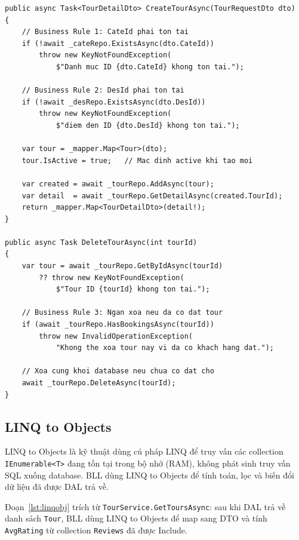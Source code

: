 \begin{lstlisting}[style=csharp,
  caption={Business Rules trong TourService --- Create và Delete},
  label={lst:bizrule}]
public async Task<TourDetailDto> CreateTourAsync(TourRequestDto dto)
{
    // Business Rule 1: CateId phai ton tai
    if (!await _cateRepo.ExistsAsync(dto.CateId))
        throw new KeyNotFoundException(
            $"Danh muc ID {dto.CateId} khong ton tai.");

    // Business Rule 2: DesId phai ton tai
    if (!await _desRepo.ExistsAsync(dto.DesId))
        throw new KeyNotFoundException(
            $"diem den ID {dto.DesId} khong ton tai.");

    var tour = _mapper.Map<Tour>(dto);
    tour.IsActive = true;   // Mac dinh active khi tao moi

    var created = await _tourRepo.AddAsync(tour);
    var detail  = await _tourRepo.GetDetailAsync(created.TourId);
    return _mapper.Map<TourDetailDto>(detail!);
}

public async Task DeleteTourAsync(int tourId)
{
    var tour = await _tourRepo.GetByIdAsync(tourId)
        ?? throw new KeyNotFoundException(
            $"Tour ID {tourId} khong ton tai.");

    // Business Rule 3: Ngan xoa neu da co dat tour
    if (await _tourRepo.HasBookingsAsync(tourId))
        throw new InvalidOperationException(
            "Khong the xoa tour nay vi da co khach hang dat.");

    // Xoa cung khoi database neu chua co dat cho
    await _tourRepo.DeleteAsync(tourId);
}
\end{lstlisting}

\subsection{LINQ to Objects}\label{sub3.3.3}

LINQ to Objects là kỹ thuật dùng cú pháp LINQ để truy vấn
các collection \texttt{IEnumerable<T>} đang tồn tại trong
bộ nhớ (RAM), không phát sinh truy vấn SQL xuống database.
BLL dùng LINQ to Objects để tính toán, lọc và biến đổi
dữ liệu đã được DAL trả về.

Đoạn~\ref{lst:linqobj} trích từ \texttt{TourService.GetToursAsync}:
sau khi DAL trả về danh sách \texttt{Tour}, BLL dùng
LINQ to Objects để map sang DTO và tính \texttt{AvgRating}
từ collection \texttt{Reviews} đã được Include.


